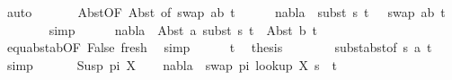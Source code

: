 \begin{isabellebody}
\ auto\isanewline
\ \ \ \ \ \isamarkupfalse%
\ Abst{\isacharparenleft}{\kern0pt}{}{\isacharparenright}{\kern0pt}{\isacharbrackleft}{\kern0pt}OF\ Abst{\isacharparenleft}{\kern0pt}{}{\isacharparenright}{\kern0pt}{\isacharcomma}{\kern0pt}\ of\ {\isacartoucheopen}swap\ {\isacharbrackleft}{\kern0pt}{\isacharparenleft}{\kern0pt}a{\isacharcomma}{\kern0pt}b{\isacharparenright}{\kern0pt}{\isacharbrackright}{\kern0pt}\ t{}{\isacharprime}{\kern0pt}{\isacartoucheclose}{\isacharbrackright}{\kern0pt}\isanewline
\ \ \ \ \isamarkupfalse%
\ {\isachardoublequoteopen}nabla\ {\isasymturnstile}\ subst\ s{}\ t{}{\isacharprime}{\kern0pt}\ {\isasymapprox}\ \ swap\ {\isacharbrackleft}{\kern0pt}{\isacharparenleft}{\kern0pt}a{\isacharcomma}{\kern0pt}b{\isacharparenright}{\kern0pt}{\isacharbrackright}{\kern0pt}\ t{}{\isacharprime}{\kern0pt}{\isachardoublequoteclose}\ \isanewline
\ \ \ \ \ \ \isamarkupfalse%
\ simp\isanewline
\ \ \ \ \isamarkupfalse%
\ {\isachardoublequoteopen}nabla\ {\isasymturnstile}\ Abst\ a\ {\isacharparenleft}{\kern0pt}subst\ s{}\ t{}{\isacharprime}{\kern0pt}{\isacharparenright}{\kern0pt}\ {\isasymapprox}\ Abst\ b\ t{}{\isacharprime}{\kern0pt}{\isachardoublequoteclose}\isanewline
\ \ \ \ \ \ \isamarkupfalse%
\ equ{\isacharunderscore}{\kern0pt}abst{\isacharunderscore}{\kern0pt}ab{\isacharbrackleft}{\kern0pt}OF\ False\ fresh{\isacharbrackright}{\kern0pt}\ \isamarkupfalse%
\ simp\isanewline
\ \ \ \ \isamarkupfalse%
\ t{}\ \isamarkupfalse%
\ {\isacharquery}{\kern0pt}thesis\isanewline
\ \ \ \ \ \ \isamarkupfalse%
\ subst{\isacharunderscore}{\kern0pt}abst{\isacharbrackleft}{\kern0pt}of\ s{}\ a\ t{}{\isacharprime}{\kern0pt}{\isacharbrackright}{\kern0pt}\ \isamarkupfalse%
\ simp\isanewline
\ \ \isamarkupfalse%
\isanewline
{}\isamarkupfalse%
\isanewline
\ \ \isamarkupfalse%
\ {\isacharparenleft}{\kern0pt}Susp\ pi\ X{\isacharparenright}{\kern0pt}\isanewline
\ \ \isamarkupfalse%
\ {\isachardoublequoteopen}nabla\ {\isasymturnstile}\ swap\ pi\ {\isacharparenleft}{\kern0pt}look{\isacharunderscore}{\kern0pt}up\ X\ s{}{\isacharparenright}{\kern0pt}\ {\isasymapprox}\ t{}{\isachardoublequoteclose}\isanewline
\ \ \ \ \isamarkupfalse%

\end{isabellebody}

